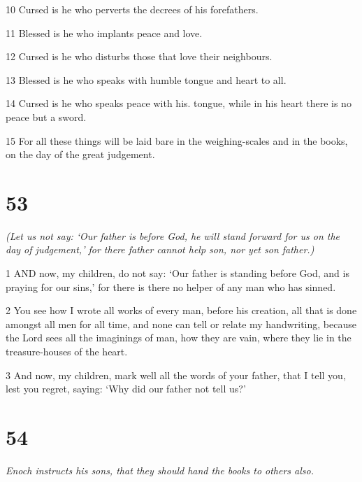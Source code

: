 \par 10 Cursed is he who perverts the decrees of his forefathers.

\par 11 Blessed is he who implants peace and love.

\par 12 Cursed is he who disturbs those that love their neighbours.

\par 13 Blessed is he who speaks with humble tongue and heart to all.

\par 14 Cursed is he who speaks peace with his. tongue, while in his heart there is no peace but a sword.

\par 15 For all these things will be laid bare in the weighing-scales and in the books, on the day of the great judgement.

\chapter{53}

\par \textit{(Let us not say: ‘Our father is before God, he will stand forward for us on the day of judgement,’ for there father cannot help son, nor yet son father.)}

\par 1 AND now, my children, do not say: ‘Our father is standing before God, and is praying for our sins,’ for there is there no helper of any man who has sinned.

\par 2 You see how I wrote all works of every man, before his creation, all that is done amongst all men for all time, and none can tell or relate my handwriting, because the Lord sees all the imaginings of man, how they are vain, where they lie in the treasure-houses of the heart.

\par 3 And now, my children, mark well all the words of your father, that I tell you, lest you regret, saying: ‘Why did our father not tell us?’

\chapter{54}

\par \textit{Enoch instructs his sons, that they should hand the books to others also.}

